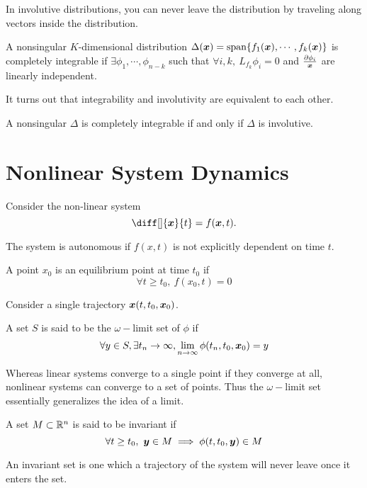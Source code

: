 In involutive distributions, you can never leave the distribution by traveling
along vectors inside the distribution.
\begin{definition}
	A nonsingular $K$-dimensional distribution $\Delta(\boldsymbol{x}) =
	\text{span}\{f_1(\boldsymbol{x}), \cdots, f_k(\boldsymbol{x})\}$ is completely integrable if
	$\exists \phi_1,\cdots,\phi_{n-k}$ such that $\forall i,k,\ L_{f_k}\phi_i = 0$
	and $\frac{\partial\phi_i}{\boldsymbol{x}}$ are linearly independent.
	\label{thm:involutive}
\end{definition}
It turns out that integrability and involutivity are equivalent to each other.
\begin{theorem}
	A nonsingular $\Delta$ is completely integrable if and only if $\Delta$ is
	involutive.
	\label{thm:frobenius}
\end{theorem}
\section{Nonlinear System Dynamics}
Consider the non-linear system \[
	\diff[]{\bs{x}}{t} = f(\bs{x}, t).
\]
\begin{definition}
	The system is autonomous if $f(x, t)$ is not explicitly dependent on time $t$.
	\label{defn:autonomous-system}
\end{definition}
\begin{definition}
	A point $x_0$ is an equilibrium point at time $t_0$ if \[
		\forall t \geq t_0, \ f(x_0, t) = 0 
	\]
	\label{defn:equilibrium-point}
\end{definition}
Consider a single trajectory $\boldsymbol{x}(t, t_0, \boldsymbol{x}_0)$.
\begin{definition}
	A set $S$ is said to be the $\omega-$limit set of $\phi$ if\[
		\forall y\in S,\exists t_n\to \infty, \lim_{n\to\infty}\phi(t_n, t_0,
		\boldsymbol{x}_0) = y
	\]
	\label{defn:w-limit-set}
\end{definition}
Whereas linear systems converge to a single point if they converge at all,
nonlinear systems can converge to a set of points. Thus the $\omega-$limit set
essentially generalizes the idea of a limit.
\begin{definition}
	A set $M\subset \mathbb{R}^n$ is said to be invariant if \[
		\forall t\geq t_0,\ \boldsymbol{y}\in M \implies \phi(t, t_0, \boldsymbol{y}) \in M
	\]
	\label{defn:invariant-set}
\end{definition}
An invariant set is one which a trajectory of the system will never leave once it enters the
set.
